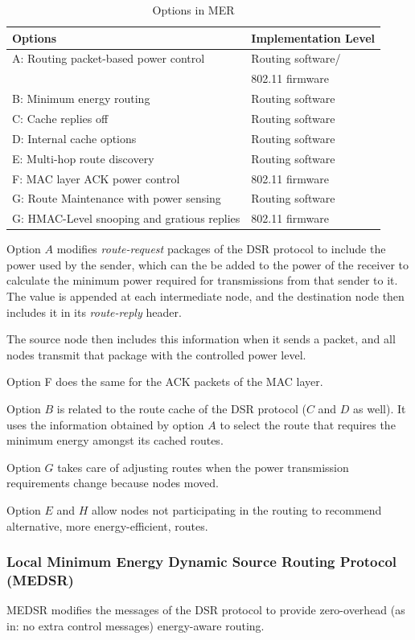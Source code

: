 \begin{table}[tb]
  \begin{tabular}{ll}
    Options & Implementation Level  \\
    \hline
    A: Routing packet-based power control & Routing software/\\ &802.11 firmware \\
    B: Minimum energy routing & Routing software \\
    C: Cache replies off & Routing software \\
    D: Internal cache options & Routing software \\
    E: Multi-hop route discovery & Routing software \\
    F: MAC layer ACK power control & 802.11 firmware \\
    G: Route Maintenance with power sensing & Routing software \\
    G: HMAC-Level snooping and gratious replies & 802.11 firmware \\
  \end{tabular}
  \caption{Options in MER}
  \label{tbl:mer-options}
\end{table}

Option $A$ modifies \textit{route-request} packages of the DSR protocol to
include the power used by the sender, which can the be added to the power
of the receiver to calculate the minimum power required for transmissions
from that sender to it. The value is appended at each intermediate node, and the
destination node then includes it in its \textit{route-reply} header.

The source node then includes this information when it sends a packet, and
all nodes transmit that package with the controlled power level.

Option F does the same for the ACK packets of the MAC layer.

Option $B$ is related to the route cache of the DSR protocol ($C$ and $D$ as well). It
uses the information obtained by option $A$ to select the route that requires
the minimum energy amongst its cached routes.

Option $G$ takes care of adjusting routes when the power transmission requirements
change because nodes moved.

Option $E$ and $H$ allow nodes not participating in the routing to recommend
alternative, more energy-efficient, routes.
\subsubsection{Local Minimum Energy Dynamic Source Routing Protocol (MEDSR)}
MEDSR\cite{tanque2007minimum} modifies the messages of the DSR protocol to
provide zero-overhead (as in: no extra control messages) energy-aware routing.


